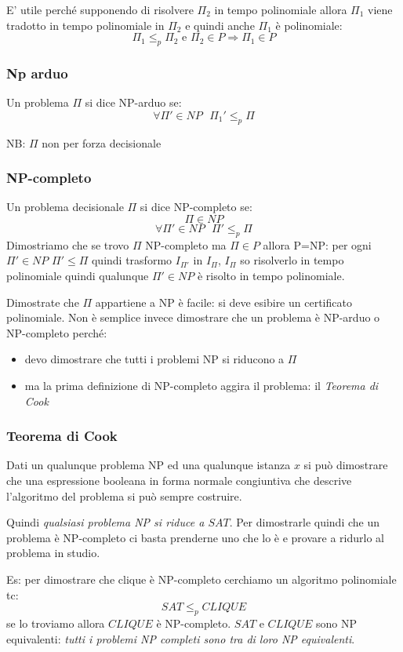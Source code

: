 E' utile perché supponendo di risolvere $\Pi_{2}$ in tempo polinomiale allora $\Pi_{1}$ viene tradotto in tempo polinomiale in $\Pi_{2}$ e quindi anche $\Pi_{1}$ è polinomiale:
$$ \Pi_{1} \leq_{p} \Pi_{2} \text{ e } \Pi_{2} \in P \Longrightarrow \Pi_{1} \in P $$

\subsubsection{Np arduo}
Un problema $\Pi$ si dice NP-arduo se:
$$ \forall \Pi' \in NP \text{  } \Pi_{1}' \leq_{p} \Pi $$

NB: $\Pi$ non per forza decisionale

\subsubsection{NP-completo}
Un problema decisionale $\Pi$ si dice NP-completo se:
$$ \Pi \in NP $$
$$ \forall \Pi' \in NP \text{  } \Pi' \leq_{p} \Pi $$
Dimostriamo che se trovo $\Pi$ NP-completo ma $\Pi \in P$ allora P=NP: per ogni $\Pi' \in NP$ $\Pi' \leq \Pi$ quindi trasformo $I_{\Pi'}$ in $I_{\Pi}$, $I_{\Pi}$ so risolverlo in tempo polinomiale quindi qualunque $\Pi' \in NP$ è risolto in tempo polinomiale.

Dimostrate che $\Pi$ appartiene a NP è facile: si deve esibire un certificato polinomiale. Non è semplice invece dimostrare che un problema è NP-arduo o NP-completo perché:
\begin{itemize}
    \item devo dimostrare che tutti i problemi NP si riducono a $\Pi$
    \item ma la prima definizione di NP-completo aggira il problema: il \emph{Teorema di Cook}
\end{itemize}

\subsubsection{Teorema di Cook}
Dati un qualunque problema NP ed una qualunque istanza $x$ si può dimostrare che una espressione booleana in forma normale congiuntiva che descrive \\ l'algoritmo del problema si può sempre costruire.

Quindi \emph{qualsiasi problema NP si riduce a $SAT$}.
Per dimostrarle quindi che un problema è NP-completo ci basta prenderne uno che lo è e provare a ridurlo al problema in studio.

Es: per dimostrare che clique è NP-completo cerchiamo un algoritmo polinomiale tc:
$$ SAT \leq_{p} CLIQUE $$
se lo troviamo allora $CLIQUE$ è NP-completo. $SAT$ e $CLIQUE$ sono NP equivalenti: \emph{tutti i problemi NP completi sono tra di loro NP equivalenti}.


